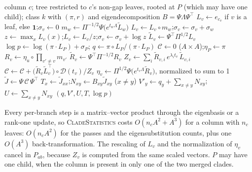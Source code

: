 \documentclass[11pt]{article}
\begin{document}
\begin{algorithm}[tbp]
\caption{Posterior statistics of one column under one class, in eigenspace}
\label{alg:clade}
\begin{algorithmic}[1]
\Require column $c$; tree restricted to $c$'s non-gap leaves, rooted at $P$
  (which may have one child); class $k$ with $(\pi,r)$ and eigendecomposition
  $B=\Psi\Lambda\Psi^\top$
   
    \State $L_v\gets e_{c_v}$ if $v$ is a leaf, else $\mathbf 1$;\quad $\sigma_v\gets0$
      \State $m_w\gets\Pi^{-1/2}\Psi\big(e^{t_w\Lambda}\tilde L_w\big)$
      \State $L_v\gets L_v\circ m_w$;\quad $\sigma_v\gets\sigma_v+\sigma_w$
    \EndFor
    \State $z\gets\max_xL_v(x)$;\quad $L_v\gets L_v/z$;\quad $\sigma_v\gets\sigma_v+\log z$
    \State $\tilde L_v\gets \Psi^\top\Pi^{1/2}L_v$ 
  \EndFor
  \State $\log p\gets\log(\pi\cdot L_P)+\sigma_P$;\quad
    $q\gets\pi\circ L_P/(\pi\cdot L_P)$ 
  \State $\mathcal C\gets0$ ($A\times A$);\quad $\eta_P\gets\pi$
    \State $R_v\gets \eta_u\circ\prod_{v'\ne v}m_{v'}$
    \State $\tilde R_v\gets \Psi^\top\Pi^{-1/2}R_v$ 
    \State $Z_v\gets\sum_i\tilde R_{v,i}\,e^{\lambda_it_v}\,\tilde L_{v,i}$
    \State $\mathcal C\gets\mathcal C+\big(\tilde R_v\tilde L_v^\top\big)\circ\mathcal D(t_v)/Z_v$
    \State $\eta_v\gets\Pi^{1/2}\Psi\big(e^{t_v\Lambda}\tilde R_v\big)$, normalized to sum to 1
  \EndFor
  \State $\tilde J\gets \Psi\,\mathcal C\,\Psi^\top$ 
  \State $T_x\gets\tilde J_{xx}$;\quad $N_{xy}\gets B_{xy}\tilde J_{xy}$ ($x\ne y$)
  \State $V'_y\gets q_y+\sum_{x\ne y}N_{xy}$;\quad $U\gets\sum_{x\ne y}N_{xy}$
  \State \Return $(q,V',U,T,\log p)$
\EndFunction
\end{algorithmic}
\end{algorithm}

Every per-branch step is a matrix--vector product through the eigenbasis or a
rank-one update, so \textsc{CladeStatistics} costs $O(n_cA^2+A^3)$ for a
column with $n_c$ leaves: $O(n_cA^2)$ for the passes and the eigensubstitution
counts, plus one $O(A^3)$ back-transformation. The rescaling of $L_v$ and the
normalization of $\eta_v$ cancel in $P_{ab}$, because $Z_v$ is computed from the
same scaled vectors. $P$ may have one child, when the column is present in
only one of the two merged clades.
\end{document}
